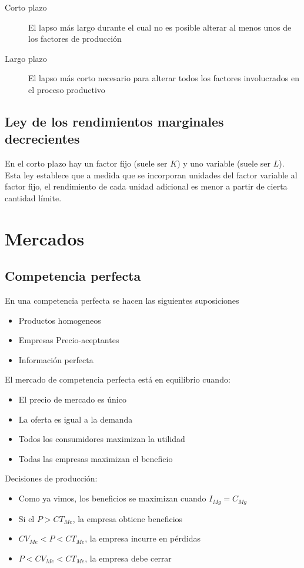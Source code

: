 \documentclass[twocolumn,10pt]{article}
\begin{document}
\begin{description}
	\item[Corto plazo] El lapso más largo durante el cual no es posible alterar al menos unos de los factores de producción
	\item[Largo plazo] El lapso más corto necesario para alterar todos los factores involucrados en el proceso productivo
\end{description}

\subsection{Ley de los rendimientos marginales decrecientes}
En el corto plazo hay un factor fijo (suele ser $K$) y uno variable (suele ser $L$). Esta ley establece que a medida que se incorporan unidades del factor variable al factor fijo, el rendimiento de cada unidad adicional es menor a partir de cierta cantidad límite.


\section{Mercados}

\subsection{Competencia perfecta}
En una competencia perfecta se hacen las siguientes suposiciones
\begin{itemize}
	\item Productos homogeneos
	\item Empresas Precio-aceptantes
	\item Información perfecta
\end{itemize}

El mercado de competencia perfecta está en equilibrio cuando:

\begin{itemize}
	\item El precio de mercado es único
	\item La oferta es igual a la demanda
	\item Todos los consumidores maximizan la utilidad
	\item Todas las empresas maximizan el beneficio
\end{itemize}

Decisiones de producción:
\begin{itemize}
	\item Como ya vimos, los beneficios se maximizan cuando $I_{Mg}=C_{Mg}$
	\item Si el $P>CT_{Me}$, la empresa obtiene beneficios
	\item $CV_{Me}<P<CT_{Me}$, la empresa incurre en pérdidas
	\item $P<CV_{Me}<CT_{Me}$, la empresa debe cerrar
\end{itemize}
\end{document}
